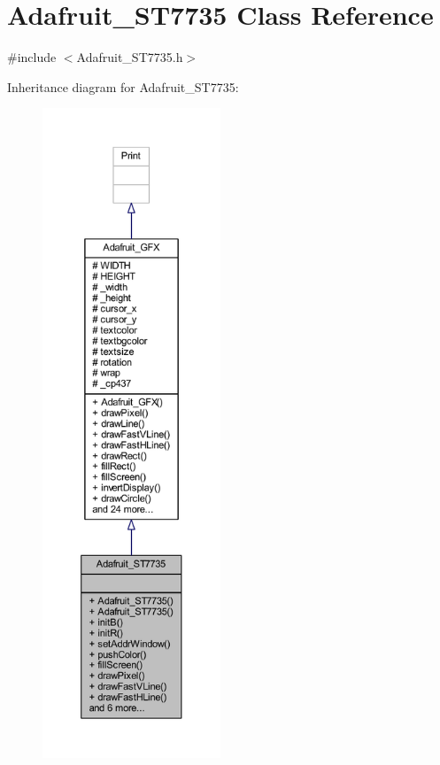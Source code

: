 \hypertarget{class_adafruit___s_t7735}{}\section{Adafruit\+\_\+\+S\+T7735 Class Reference}
\label{class_adafruit___s_t7735}


{\ttfamily \#include $<$Adafruit\+\_\+\+S\+T7735.\+h$>$}



Inheritance diagram for Adafruit\+\_\+\+S\+T7735\+:
\nopagebreak
\begin{figure}[H]
\begin{center}
\leavevmode
\includegraphics[height=550pt]{d5/d8b/class_adafruit___s_t7735__inherit__graph}
\end{center}
\end{figure}


